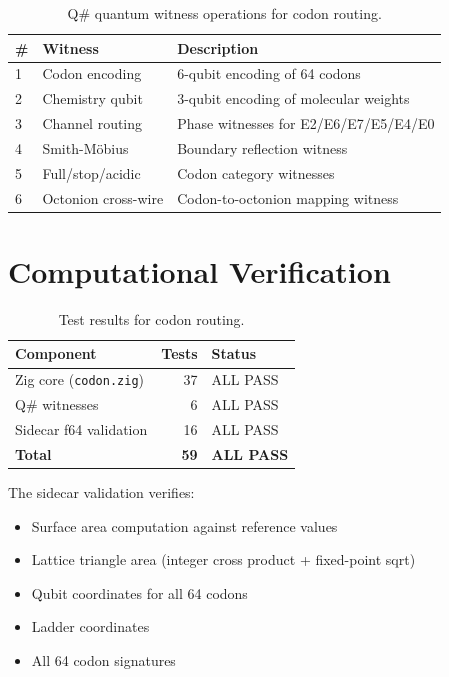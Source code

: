 \documentclass[11pt]{article}
\begin{document}
\begin{table}[ht]
\centering
\caption{Q\# quantum witness operations for codon routing.}
\label{tab:qsharp}
\begin{tabular}{llp{7cm}}
\toprule
\# & Witness & Description \\
\midrule
1 & Codon encoding & 6-qubit encoding of 64 codons \\
2 & Chemistry qubit & 3-qubit encoding of molecular weights \\
3 & Channel routing & Phase witnesses for E2/E6/E7/E5/E4/E0 \\
4 & Smith-M\"obius & Boundary reflection witness \\
5 & Full/stop/acidic & Codon category witnesses \\
6 & Octonion cross-wire & Codon-to-octonion mapping witness \\
\bottomrule
\end{tabular}
\end{table}

\section{Computational Verification}

\begin{table}[ht]
\centering
\caption{Test results for codon routing.}
\label{tab:tests}
\begin{tabular}{lrl}
\toprule
Component & Tests & Status \\
\midrule
Zig core (\texttt{codon.zig}) & 37 & ALL PASS \\
Q\# witnesses & 6 & ALL PASS \\
Sidecar f64 validation & 16 & ALL PASS \\
\midrule
\textbf{Total} & \textbf{59} & \textbf{ALL PASS} \\
\bottomrule
\end{tabular}
\end{table}

The sidecar validation verifies:
\begin{itemize}
\item Surface area computation against reference values
\item Lattice triangle area (integer cross product + fixed-point sqrt)
\item Qubit coordinates for all 64 codons
\item Ladder coordinates
\item All 64 codon signatures
\end{itemize}
\end{document}

